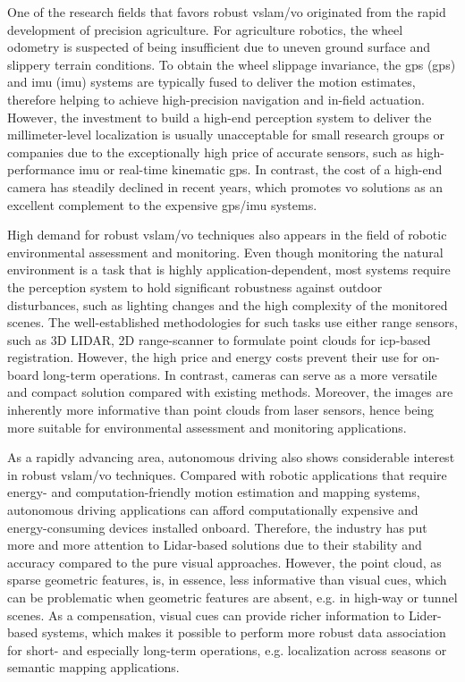 One of the research fields that favors robust \acrshort{vslam}/\acrshort{vo} originated from the rapid development of precision agriculture. 
For agriculture robotics, the wheel odometry is suspected of being insufficient due to uneven ground surface and slippery terrain conditions. 
To obtain the wheel slippage invariance, the \acrlong{gps} (\acrshort{gps}) and \acrlong{imu} (\acrshort{imu}) systems are typically fused to deliver the motion estimates, therefore helping to achieve high-precision navigation and in-field actuation. 
However, the investment to build a high-end perception system to deliver the millimeter-level localization is usually unacceptable for small research groups or companies due to the exceptionally high price of accurate sensors, such as high-performance \acrshort{imu} or real-time kinematic \acrshort{gps}. 
In contrast, the cost of a high-end camera has steadily declined in recent years, which promotes \acrshort{vo} solutions as an excellent complement to the expensive \acrshort{gps}/\acrshort{imu} systems.

High demand for robust \acrshort{vslam}/\acrshort{vo} techniques also appears in the field of robotic environmental assessment and monitoring. 
Even though monitoring the natural environment is a task that is highly application-dependent, most systems require the perception system to hold significant robustness against outdoor disturbances, such as lighting changes and the high complexity of the monitored scenes. 
The well-established methodologies for such tasks use either range sensors, such as 3D LIDAR, 2D range-scanner to formulate point clouds for \acrshort{icp}-based registration. 
However, the high price and energy costs prevent their use for on-board long-term operations. 
In contrast, cameras can serve as a more versatile and compact solution compared with existing methods.
Moreover, the images are inherently more informative than point clouds from laser sensors, hence being more suitable for environmental assessment and monitoring applications.

As a rapidly advancing area, autonomous driving also shows considerable interest in robust \acrshort{vslam}/\acrshort{vo} techniques.
Compared with robotic applications that require energy- and computation-friendly motion estimation and mapping systems, autonomous driving applications can afford computationally expensive and energy-consuming devices installed onboard. 
Therefore, the industry has put more and more attention to Lidar-based solutions due to their stability and accuracy compared to the pure visual approaches. 
However, the point cloud, as sparse geometric features, is, in essence, less informative than visual cues, which can be problematic when geometric features are absent, e.g. in high-way or tunnel scenes.
As a compensation, visual cues can provide richer information to Lider-based systems, which makes it possible to perform more robust data association for short- and especially long-term operations, e.g. localization across seasons or semantic mapping applications.

